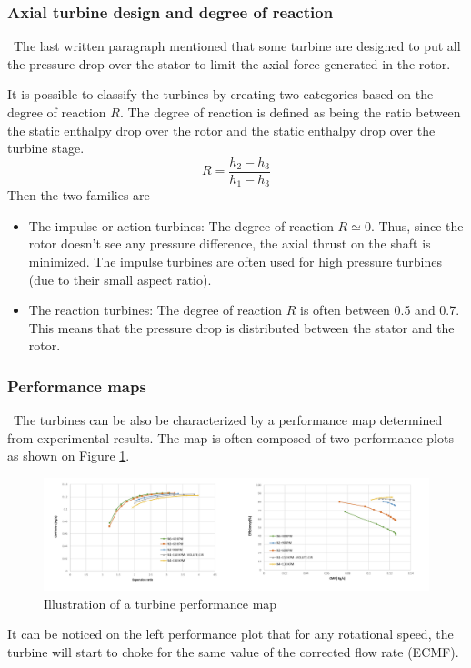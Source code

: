 \subsubsection{Axial turbine design and degree of reaction}
\quad\, The last written paragraph mentioned that some turbine are designed to put all the pressure drop over the stator to limit the axial force generated in the rotor.

It is possible to classify the turbines by creating two categories based on the degree of reaction $R$. The degree of reaction is defined as being the ratio between the static enthalpy drop over the rotor and the static enthalpy drop over the turbine stage.
\begin{equation}
R = \frac{h_2 - h_3}{h_1 - h_3}\label{eq:C3_R}
\end{equation}
Then the two families are 

\begin{itemize}
\item The impulse or action turbines: The degree of reaction $R\simeq 0$. Thus, since the rotor doesn't see any pressure difference, the axial thrust on the shaft is minimized. The impulse turbines are often used for high pressure turbines (due to their small aspect ratio).
\item The reaction turbines: The degree of reaction $R$ is often between 0.5 and 0.7. This means that the pressure drop is distributed between the stator and the rotor. 
\end{itemize}

\subsubsection{Performance maps}
\quad\, The turbines can be also be characterized by a performance map determined from experimental results. The map is often composed of two performance plots as shown on Figure \ref{fig:C3_turbmap}.

\begin{figure}[h]
\centering
\includegraphics[width=\textwidth]{Turb_Map.png}
\caption{Illustration of a turbine performance map}
\label{fig:C3_turbmap}
\end{figure}  

It can be noticed on the left performance plot that for any rotational speed, the turbine will start to choke for the same value of the corrected flow rate (ECMF). 